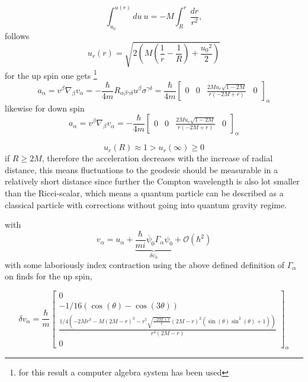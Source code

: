 \documentclass[12pt,a4paper]{article}
\begin{document}
	$$
	\int_{u_0}^{u(r)} du \ u = - M \int _R^r \frac{dr}{r^2},
	$$
	follows
	$$
	u_r(r) = \sqrt{2\left(M\left(\frac{1}{r}-\frac{1}{R}\right) + \frac{{u_0}^2}{2} \right)}
	$$
	for the up spin one gets \footnote{for this result a computer algebra system has been used}
	\begin{equation}
		a_\alpha = v^\beta \nabla_\beta v_\alpha =  -\frac{\hbar}{4m} R_{\alpha \beta \gamma \delta}u^\beta \sigma^{\gamma \delta} = \frac{\hbar}{4m} \left[\begin{matrix}0 & 0 & \frac{2 M u_{r} \sqrt{1 - 2 M}}{r \left(- 2 M + r\right)} & 0\end{matrix}\right]_\alpha
	\end{equation}
	likewise for down spin
	\begin{equation}
		a_\alpha = v^\beta \nabla_\beta v_\alpha = -\frac{\hbar}{4m} \left[\begin{matrix}0 & 0 & \frac{2 M u_{r} \sqrt{1 - 2 M}}{r \left(- 2 M + r\right)} & 0\end{matrix}\right]_\alpha
	\end{equation}
	
	$$
	u_r(R) \approx 1 > u_r(\infty) \geq 0 
	$$
	if $R\geq 2M$, 
	therefore the acceleration decreases with the increase of radial distance, this means fluctuations to the geodesic should be measurable in a relatively short distance since further the Compton wavelength is also lot smaller than the Ricci-scalar, which means a quantum particle can be described as a classical particle with corrections without going into quantum gravity regime. 
	
	with 
	\begin{equation}
		\label{correction_to_v}
		v_\alpha = u_\alpha + \underbrace{\frac{\hbar}{mi}\overbar{\psi}_0 \Gamma_\alpha \psi_0}_{\delta v_\alpha} +\mathcal{O} (\hbar^2)
	\end{equation}
	with some laboriously index contraction using the above defined definition of $\Gamma_\alpha$
	on finds for the up spin,
	
	$$
	\delta v_\alpha = \frac{\hbar}{m} \left[\begin{matrix}0\\- 1/16 \left( \cos{\left(\theta \right)} - \cos{\left(3 \theta \right)}\right)\\\frac{1/4 \left(- 2 M r^{3} - M  \left(2 M - r\right)^{3} - r^{5} \sqrt{\frac{- 2 M + r}{r}} \left(2 M - r\right)^{2} \left(\sin{\left(\theta \right)} \sin^{2}{\left(\theta \right)} + 1\right)\right)}{r^{4}  \left(2 M - r\right)}\\0\end{matrix}\right]_\alpha
	$$
	
\end{document}
